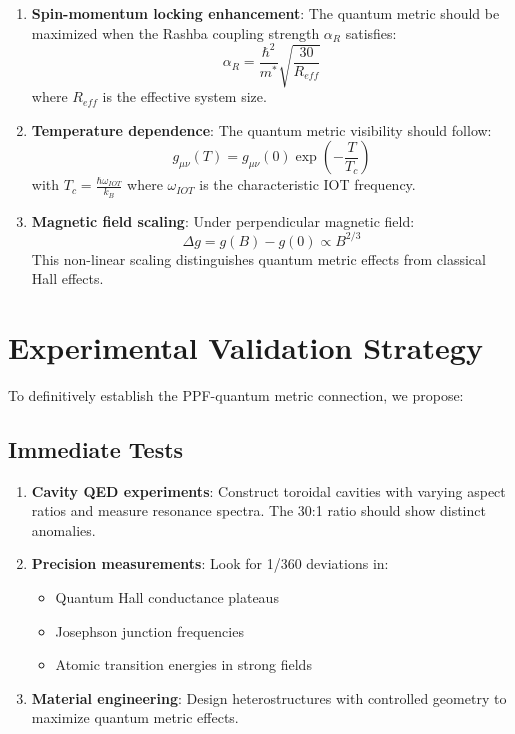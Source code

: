 \documentclass[conference]{IEEEtran}
\begin{document}
\begin{enumerate}
\item \textbf{Spin-momentum locking enhancement}: The quantum metric should be maximized when the Rashba coupling strength $\alpha_R$ satisfies:
\begin{equation}
\alpha_R = \frac{\hbar^2}{m^*} \sqrt{\frac{30}{R_{eff}}}
\end{equation}
where $R_{eff}$ is the effective system size.

\item \textbf{Temperature dependence}: The quantum metric visibility should follow:
\begin{equation}
g_{\mu\nu}(T) = g_{\mu\nu}(0) \exp\left(-\frac{T}{T_c}\right)
\end{equation}
with $T_c = \frac{\hbar\omega_{IOT}}{k_B}$ where $\omega_{IOT}$ is the characteristic IOT frequency.

\item \textbf{Magnetic field scaling}: Under perpendicular magnetic field:
\begin{equation}
\Delta g = g(B) - g(0) \propto B^{2/3}
\end{equation}
This non-linear scaling distinguishes quantum metric effects from classical Hall effects.
\end{enumerate}

\section{Experimental Validation Strategy}

To definitively establish the PPF-quantum metric connection, we propose:

\subsection{Immediate Tests}
\begin{enumerate}
\item \textbf{Cavity QED experiments}: Construct toroidal cavities with varying aspect ratios and measure resonance spectra. The 30:1 ratio should show distinct anomalies.

\item \textbf{Precision measurements}: Look for 1/360 deviations in:
\begin{itemize}
\item Quantum Hall conductance plateaus
\item Josephson junction frequencies
\item Atomic transition energies in strong fields
\end{itemize}

\item \textbf{Material engineering}: Design heterostructures with controlled geometry to maximize quantum metric effects.
\end{enumerate}
\end{document}
